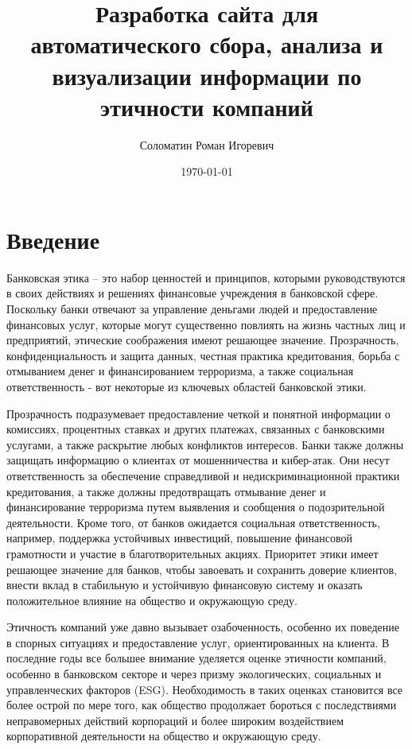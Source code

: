 \documentclass[PI, VKR]{HSEUniversity}
\author{Соломатин Роман Игоревич}
\date{\today}
\title{Разработка сайта для автоматического сбора, анализа и визуализации информации по этичности компаний}
\begin{document}
\maketitle

\chapter*{Введение}
\label{sec:org71b1cae}
Банковская этика -- это набор ценностей и принципов, которыми руководствуются в своих действиях и решениях финансовые учреждения в банковской сфере. Поскольку банки отвечают за управление деньгами людей и предоставление финансовых услуг, которые могут существенно повлиять на жизнь частных лиц и предприятий, этические соображения имеют решающее значение. Прозрачность, конфиденциальность и защита данных, честная практика кредитования, борьба с отмыванием денег и финансированием терроризма, а также социальная ответственность - вот некоторые из ключевых областей банковской этики.

Прозрачность подразумевает предоставление четкой и понятной информации о комиссиях, процентных ставках и других платежах, связанных с банковскими услугами, а также раскрытие любых конфликтов интересов. Банки также должны защищать информацию о клиентах от мошенничества и кибер-атак. Они несут ответственность за обеспечение справедливой и недискриминационной практики кредитования, а также должны предотвращать отмывание денег и финансирование терроризма путем выявления и сообщения о подозрительной деятельности. Кроме того, от банков ожидается социальная ответственность, например, поддержка устойчивых инвестиций, повышение финансовой грамотности и участие в благотворительных акциях. Приоритет этики имеет решающее значение для банков, чтобы завоевать и сохранить доверие клиентов, внести вклад в стабильную и устойчивую финансовую систему и оказать положительное влияние на общество и окружающую среду.

Этичность компаний уже давно вызывает озабоченность, особенно их поведение в спорных ситуациях и предоставление услуг, ориентированных на клиента. В последние годы все большее внимание уделяется оценке этичности компаний\autocite{mure_esg_2021}, особенно в банковском секторе и через призму экологических, социальных и управленческих факторов (ESG). Необходимость в таких оценках становится все более острой по мере того, как общество продолжает бороться с последствиями неправомерных действий корпораций и более широким воздействием корпоративной деятельности на общество и окружающую среду.
\end{document}
